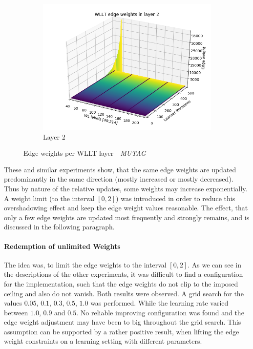 \begin{figure}[H]
\begin{subfigure}{0.3\textwidth}
				\centering
				\includegraphics[width=1.\linewidth]{images/plotA3_WLLT_ewL2_MUTAG_d5_e500}
				\caption{Layer 2}
				\label{fig:fig:plota3wlltewl2mutagd5e500}
			\end{subfigure}
			\caption{Edge weights per WLLT layer - \textit{MUTAG}}
			\label{fig:MUTAG_exponential_layers}
		\end{figure}
	
		These and similar experiments show, that the same edge weights are updated predominantly in the same direction (mostly increased or mostly decreased).
		Thus by nature of the relative updates, some weights may increase exponentially.	
		A weight limit (to the interval $[0,2]$) was introduced in order to reduce this overshadowing effect and keep the edge weight values reasonable.
		The effect, that only a few edge weights are updated most frequently and strongly remains, and is discussed in the following paragraph.
			
		\paragraph{Redemption of unlimited Weights} The idea was, to limit the edge weights to the interval $[0, 2]$.
		As we can see in the descriptions of the other experiments, it was difficult to find a configuration for the implementation, such that the edge weights do not clip to the imposed ceiling and also do not vanish.
		Both results were observed.
		A grid search for the values $0.05$, $0.1$, $0.3$, $0.5$, $1.0$ was performed.
		While the learning rate varied between $1.0$, $0.9$ and $0.5$.
		No reliable improving configuration was found and the edge weight adjustment may have been to big throughout the grid search.
		This assumption can be supported by a rather positive result, when lifting the edge weight constraints on a learning setting with different parameters.		
				

